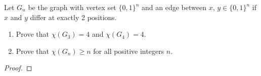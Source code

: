 \documentclass[../hw7]{subfiles}
\begin{document}
\begin{problem}
\item Let $G_n$ be the graph with vertex set $\{0,1\}^n$ and an edge between $x$, $y \in \{0,1\}^n$ if $x$ and $y$ differ at exactly 2 positions.
\begin{enumerate}
	\item Prove that $\chi(G_3) = 4$ and $\chi(G_4) = 4$.
	\item Prove that $\chi(G_n) \ge n$ for all positive integers $n$.
\end{enumerate}

\end{problem}
\begin{proof}

\end{proof}
\end{document}
